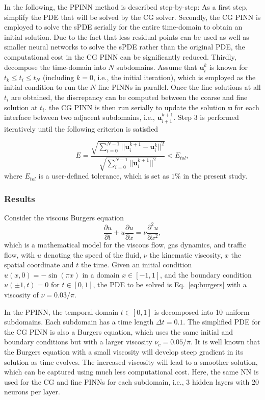 \documentclass[conference,compsoc]{IEEEtran}
\begin{document}
In the following, the PPINN method is described step-by-step:
As a first step, simplify the PDE that will be solved by the CG solver. Secondly, the CG PINN is employed to solve the sPDE serially for the entire time-domain to obtain an initial solution\cite{meng2020ppinn}. Due to the fact that less residual points can be used as well as smaller neural networks to solve the sPDE rather than the original PDE, the computational cost in the CG PINN can be significantly reduced. Thirdly, decompose the time-domain into $N$ subdomains. Assume that $\mathbf{u}_i^k$ is known for $t_k \le t_i \leq t_N$ (including $k = 0$, i.e., the initial iteration), which is employed as the initial condition to run the $N$ fine PINNs in parallel\cite{meng2020ppinn}. Once the fine solutions at all $t_i$ are obtained, the discrepancy can be computed between the coarse and fine solution at $t_i$. the CG PINN is then run serially  to update the solution $\mathbf{u}$ for each interface between two adjacent subdomains, i.e., $\mathbf{u}_{i+1}^{k+1}$. Step 3 is performed iteratively until the following criterion is satisfied 

\begin{equation}
    E = \frac{\sqrt{\sum^{N-1}_{i=0} ||\mathbf{u}_{i}^{k+1} - \mathbf{u}_{i}^{k}||^2}}{\sqrt{\sum^{N-1}_{i=0} ||\mathbf{u}_{i}^{k+1}||^2}} < E_{tol},
\end{equation}
where $E_{tol}$ is a user-defined tolerance, which is set as $1\%$ in the present study.  



\subsubsection{Results}
Consider the viscous Burgers equation
\begin{equation}\label{eq:burgers}
 \frac{\partial u}{\partial t} + u\frac{\partial u}{\partial x} = \nu \frac{\partial^2 u}{\partial x^2},
\end{equation}
which is a mathematical model for the viscous flow, gas dynamics, and traffic flow, with $u$ denoting the speed of the fluid, $\nu$ the kinematic viscosity, $x$ the spatial coordinate and $t$ the time. Given an initial condition $u(x,0)=-\sin(\pi x)$ in a domain $x\in[-1,1]$, and the boundary condition $u(\pm 1, t) = 0$ for $t\in [0,1]$, the PDE to be solved is Eq.~\eqref{eq:burgers} with a viscosity of $\nu = 0.03/\pi$. 



In the PPINN, the temporal domain $t \in [0, 1]$ is decomposed into 10 uniform subdomains\cite{meng2020ppinn}. Each subdomain has a time length $\Delta t = 0.1$. The simplified PDE for the CG PINN is also a Burgers equation, which uses the same initial and boundary conditions but with a larger viscosity $\nu_c = 0.05/\pi$. It is well known that the Burgers equation with a small viscosity will develop steep gradient in its solution as time evolves.  The increased viscosity will lead to a smoother solution, which can be captured using much less computational cost\cite{meng2020ppinn}. Here, the same NN is used for the CG and fine PINNs for each subdomain, i.e., 3 hidden layers with 20 neurons per layer.
\end{document}
